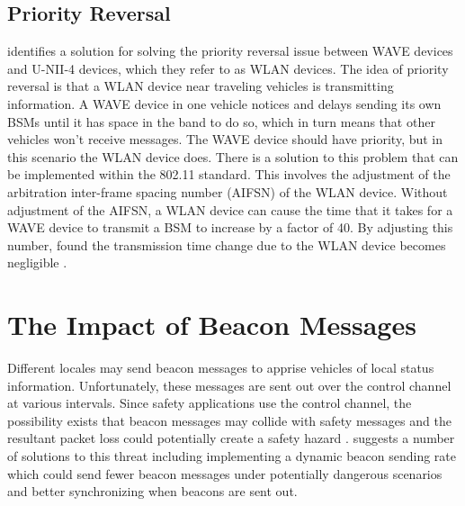 \documentclass[twoside,conference]{IEEEtran}
\begin{document}
		 \subsection{Priority Reversal}
		 \cite{Park2014} identifies a solution for solving the priority reversal issue between WAVE devices and U-NII-4 devices, which they refer to as WLAN devices.  The idea of priority reversal is that a WLAN device near traveling vehicles is transmitting information.  A WAVE device in one vehicle notices and delays sending its own BSMs until it has space in the band to do so, which in turn means that other vehicles won't receive messages.  The WAVE device should have priority, but in this scenario the WLAN device does.  There is a solution to this problem that can be implemented within the 802.11 standard.  This involves the adjustment of the arbitration inter-frame spacing number (AIFSN) of the WLAN device.  Without adjustment of the AIFSN, a WLAN device can cause the time that it takes for a WAVE device to transmit a BSM to increase by a factor of 40.  By adjusting this number, found the transmission time change due to the WLAN device becomes negligible \cite[p. 165]{Park2014}.
		 
		
\section{The Impact of Beacon Messages}\label{sec:beacons}
		Different locales may send beacon messages to apprise vehicles of local status information. Unfortunately, these messages are sent out over the control channel at various intervals. Since safety applications use the control channel, the possibility exists that beacon messages may collide with safety messages and the resultant packet loss could potentially create a safety hazard \cite{Doukha2015}. \cite{Doukha2015} suggests a number of solutions to this threat including implementing a dynamic beacon sending rate which could send fewer beacon messages under potentially dangerous scenarios and better synchronizing when beacons are sent out.
\end{document}
